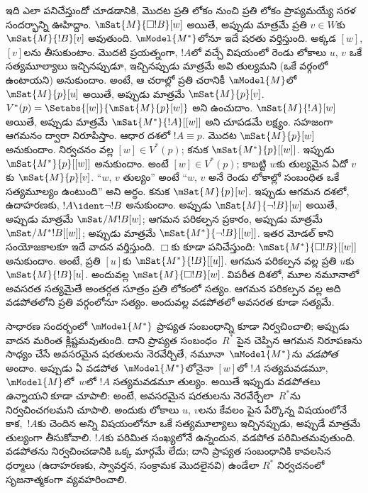 \documentclass[../../../include/open-logic-section]{subfiles}
\begin{document}
ఇది ఎలా పనిచేస్తుందో చూడడానికి, మొదట ప్రతి లోకం
నుంచి ప్రతి లోకం ప్రాప్యమయ్యే సరళ సందర్భాన్ని
ఊహిద్దాం. $\mSat{M}{\Box !B}[w]$ అయితే, అప్పుడు మాత్రమే
ప్రతి $v \in W$కు $\mSat{M}{!B}[v]$ అవుతుంది. $\mModel{M^*}$లోనూ
ఇదే షరతు వర్తిస్తుంది. అక్కడ $[w]$, $[v]$లను తీసుకుంటాం.
మొదటి ప్రయత్నంగా, $!A$లో వచ్చే
విషయంలో రెండు లోకాలు $u$, $v$ ఒకే సత్యమూల్యాలు ఇచ్చినప్పుడూ, ఇచ్చినప్పుడు మాత్రమే
అవి తుల్యమని (ఒకే వర్గంలో ఉంటాయని) అనుకుందాం. అంటే,
ఆ చరాల్లో ప్రతి చరానికీ
$\mModel{M}$లో
$\mSat{M}{p}[u]$ అయితే, అప్పుడు మాత్రమే
$\mSat{M}{p}[v]$.
$V^*(p) = \Setabs{[w]}{\mSat{M}{p}[w]}$ అని ఉంచుదాం.
$\mSat{M}{!A}[w]$ అయితే, అప్పుడు మాత్రమే
$\mSat{M^*}{!A}[{[w]}]$ అని చూపడమే లక్ష్యం. సహజంగా
ఆగమనం ద్వారా నిరూపిస్తాం. ఆధార దశలో $!A \equiv p$.
మొదట $\mSat{M}{p}[w]$ అనుకుందాం. నిర్వచనం వల్ల
$[w] \in V^*(p)$; కనుక $\mSat{M^*}{p}[{[w]}]$.
ఇప్పుడు $\mSat{M^*}{p}[{[w]}]$ అనుకుందాం. అంటే
$[w] \in V^*(p)$; కాబట్టి $w$కు తుల్యమైన ఏదో $v$కు
$\mSat{M}{p}[v]$. ``$w$, $v$ తుల్యం'' అంటే ``$w$, $v$ అనే రెండు లోకాల్లో
సంబంధిత 
ఒకే సత్యమూల్యం ఉంటుంది'' అని అర్థం. కనుక $\mSat{M}{p}[w]$.
ఇప్పుడు ఆగమన దశలో, ఉదాహరణకు, $!A \ident \lnot !B$
అనుకుందాం. అప్పుడు $\mSat{M}{\lnot !B}[w]$ అయితే,
అప్పుడు మాత్రమే $\mSat/{M}{!B}[w]$; ఆగమన పరికల్పన
ప్రకారం, అప్పుడు మాత్రమే $\mSat/{M^*}{!B}[{[w]}]$;
అప్పుడు మాత్రమే $\mSat{M^*}{\lnot !B}[{[w]}]$.
ఇతర మోడల్ కాని సంయోజకాలకూ ఇదే వాదన వర్తిస్తుంది.
$\Box$కు కూడా పనిచేస్తుంది: $\mSat{M^*}{\Box
  !B}[{[w]}]$ అనుకుందాం. అంటే, ప్రతి $[u]$కు
$\mSat{M^*}{!B}[{[u]}]$. ఆగమన పరికల్పన వల్ల ప్రతి
$u$కు $\mSat{M}{!B}[u]$. అందువల్ల
$\mSat{M}{\Box !B}[w]$.
విపరీత దిశలో, మూల నమూనాలో అవసరత సత్యమైతే అంతర్గత సూత్రం
ప్రతి లోకంలో సత్యం. ఆగమన పరికల్పన వల్ల అది వడపోతలోని ప్రతి
వర్గంలోనూ సత్యం. అందువల్ల వడపోతలో అవసరత కూడా సత్యమే.

సాధారణ సందర్భంలో $\mModel{M^*}$ ప్రాప్యత సంబంధాన్ని
కూడా నిర్వచించాలి; అప్పుడు వాదన మరింత క్లిష్టమవుతుంది.
దాని ప్రాప్యత సంబంధం~$R^*$ పైన చెప్పిన ఆగమన
నిరూపణను సాధ్యం చేసే అవసరమైన షరతులను నెరవేర్చితే,
నమూనా~$\mModel{M^*}$ను \emph{వడపోత} అందాం. అప్పుడు
ఏ వడపోత~$\mModel{M^*}$లోనైనా $[w]$లో $!A$
సత్యమవడమూ, $\mModel{M}$లో~$w$లో
$!A$ సత్యమవడమూ తుల్యం. అయితే ఇప్పుడు వడపోతలు \emph{ఉన్నాయని}
కూడా చూపాలి: అంటే, అవసరమైన షరతులను నెరవేర్చేలా~$R^*$ను
నిర్వచించగలమని చూపాలి. అందుకు లోకాలు $u$, $v$లను
కేవలం పైన పేర్కొన్న
విషయంలోనే కాక,~$!A$కు చెందిన అన్ని
 విషయంలోనూ
ఒకే సత్యమూల్యాలు ఇచ్చినప్పుడు, అప్పుడే మాత్రమే తుల్యంగా తీసుకోవాలి. $!A$కు పరిమిత
సంఖ్యలోనే  ఉన్నందున,
వడపోత పరిమితమవుతుంది. వడపోతను
నిర్వచించడానికి ఒక్క మార్గమే లేదు; దాని ప్రాప్యత
సంబంధానికి కావలసిన ధర్మాలు (ఉదాహరణకు, స్వావర్తన,
సంక్రామక మొదలైనవి) ఉండేలా $R^*$ నిర్వచనంలో
సృజనాత్మకంగా వ్యవహరించాలి.
\end{document}
